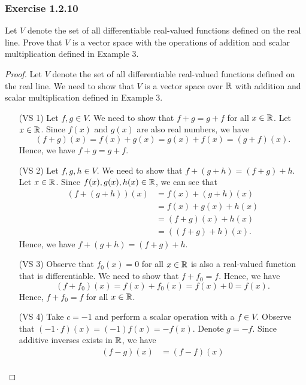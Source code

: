 \subsubsection{Exercise 1.2.10} Let \( V  \) denote the set of all differentiable real-valued functions defined on the real line. Prove that \( V  \) is a vector space with the operations of addition and scalar multiplication defined in Example 3.  
\begin{proof}
    Let \( V  \) denote the set of all differentiable real-valued functions defined on the real line. We need to show that \( V  \) is a vector space over \( \mathbb{R}  \) with addition and scalar multiplication defined in Example 3.
    \begin{enumerate}
        \item[(VS 1)] Let \( f,g \in V  \). We need to show that \( f + g = g + f  \) for all \( x \in \mathbb{R}  \). Let \( x \in \mathbb{R}  \). Since \( f(x)  \) and \( g(x)  \) are also real numbers, we have 
            \[  (f+g)(x) = f(x) + g(x) = g(x) + f(x) = (g+f)(x).  \]
            Hence, we have \( f + g = g +f  \).
        \item[(VS 2)] Let \( f,g, h \in V  \). We need to show that \( f + (g +h) = (f+g) + h  \). Let \( x \in \mathbb{R}  \). Since \( f(x), g(x), h(x) \in \mathbb{R}    \), we can see that 
            \begin{align*}
                (f+(g+h))(x ) &= f(x) + (g+h)(x) \\
                              &= f(x) + g(x) + h(x) \\
                              &= (f+g)(x) + h(x) \\  
                              &= ((f+g) + h )(x).
            \end{align*}
            Hence, we have \( f + (g+h) = (f+g) + h  \).
        \item[(VS 3)] Observe that \( f_{0}(x) = 0  \) for all \( x \in \mathbb{R}  \) is also a real-valued function that is differentiable. We need to show that \( f + f_{0} = f   \). Hence, we have 
            \[  (f + f_{0})(x) = f(x) + f_{0}(x) = f(x) + 0 = f(x).  \]
            Hence, \( f + f_{0} = f  \) for all \( x \in \mathbb{R}  \).
        \item[(VS 4)] Take \( c = -1  \) and perform a scalar operation with a \( f \in V   \). Observe that \( (-1 \cdot f )(x) = (-1)f(x) = -f(x) \). Denote \( g = -f  \). Since additive inverses exists in \( \mathbb{R}  \), we have 
            \begin{align*}
                (f-g)(x) &= (f-f)(x) \\

\end{align*}
\end{enumerate}
\end{proof}
